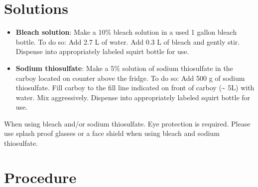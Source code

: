 \documentclass[
  letterpaper,
  DIV=11,
  numbers=noendperiod]{scrreprt}
\providecommand{\tightlist}{%
  \setlength{\itemsep}{0pt}\setlength{\parskip}{0pt}}\usepackage{longtable,booktabs,array}
\begin{document}
\hypertarget{solutions-22}{%
\section{Solutions}\label{solutions-22}}

\begin{itemize}
\tightlist
\item
  \textbf{Bleach solution}: Make a 10\% bleach solution in a used 1
  gallon bleach bottle. To do so: Add 2.7 L of water. Add 0.3 L of
  bleach and gently stir. Dispense into appropriately labeled squirt
  bottle for use.
\item
  \textbf{Sodium thiosulfate}: Make a 5\% solution of sodium thiosulfate
  in the carboy located on counter above the fridge. To do so: Add 500 g
  of sodium thiosulfate. Fill carboy to the fill line indicated on front
  of carboy (\textasciitilde{} 5L) with water. Mix aggressively.
  Dispense into appropriately labeled squirt bottle for use.
\end{itemize}

\begin{tcolorbox}[enhanced jigsaw, toprule=.15mm, breakable, coltitle=black, leftrule=.75mm, title=\textcolor{quarto-callout-caution-color}{\faFire}\hspace{0.5em}{Chemical Hygiene}, bottomrule=.15mm, toptitle=1mm, bottomtitle=1mm, colframe=quarto-callout-caution-color-frame, opacityback=0, colback=white, opacitybacktitle=0.6, colbacktitle=quarto-callout-caution-color!10!white, rightrule=.15mm, titlerule=0mm, arc=.35mm, left=2mm]

When using bleach and/or sodium thiosulfate. Eye protection is required.
Please use splash proof glasses or a face shield when using bleach and
sodium thiosulfate.

\end{tcolorbox}

\hypertarget{procedure-27}{%
\section{Procedure}\label{procedure-27}}
\end{document}
